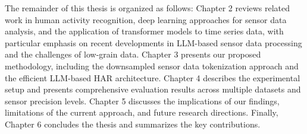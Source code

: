 The remainder of this thesis is organized as follows: Chapter 2 reviews related work in human activity recognition, deep learning approaches for sensor data analysis, and the application of transformer models to time series data, with particular emphasis on recent developments in LLM-based sensor data processing and the challenges of low-grain data. Chapter 3 presents our proposed methodology, including the downsampled sensor data tokenization approach and the efficient LLM-based HAR architecture. Chapter 4 describes the experimental setup and presents comprehensive evaluation results across multiple datasets and sensor precision levels. Chapter 5 discusses the implications of our findings, limitations of the current approach, and future research directions. Finally, Chapter 6 concludes the thesis and summarizes the key contributions.